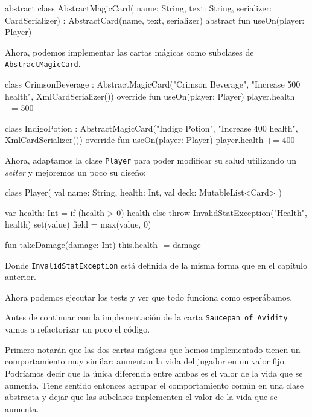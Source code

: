   \begin{kotlin}
    abstract class AbstractMagicCard(
      name: String, text: String, serializer: CardSerializer) :
        AbstractCard(name, text, serializer) {
      abstract fun useOn(player: Player)
    }
  \end{kotlin}

  Ahora, podemos implementar las cartas mágicas como subclases de \texttt{AbstractMagicCard}.

  \begin{kotlin}
    class CrimsonBeverage :
        AbstractMagicCard("Crimson Beverage", "Increase 500 health", XmlCardSerializer()) {
      override fun useOn(player: Player) {
        player.health += 500
      }
    }
  \end{kotlin}

  \begin{kotlin}
    class IndigoPotion :
        AbstractMagicCard("Indigo Potion", "Increase 400 health", XmlCardSerializer()) {
      override fun useOn(player: Player) {
        player.health += 400
      }
    }
  \end{kotlin}

  Ahora, adaptamos la clase \texttt{Player} para poder modificar su salud utilizando un 
  \textit{setter} y mejoremos un poco su diseño:

  \begin{kotlin}
    class Player(
      val name: String,
      health: Int,
      val deck: MutableList<Card>
    ) {
      var health: Int =
        if (health > 0) health else throw InvalidStatException("Health", health)
        set(value) {
          field = max(value, 0)
        }

      fun takeDamage(damage: Int) {
        this.health -= damage
      }
    }
  \end{kotlin}

  Donde \texttt{InvalidStatException} está definida de la misma forma que en el capítulo anterior.

  Ahora podemos ejecutar los tests y ver que todo funciona como esperábamos.

  Antes de continuar con la implementación de la carta \texttt{Saucepan of Avidity} vamos a
  refactorizar un poco el código.

  Primero notarán que las dos cartas mágicas que hemos implementado tienen un comportamiento
  muy similar: aumentan la vida del jugador en un valor fijo.
  Podríamos decir que la única diferencia entre ambas es el valor de la vida que se aumenta.
  Tiene sentido entonces agrupar el comportamiento común en una clase abstracta y dejar que
  las subclases implementen el valor de la vida que se aumenta.

